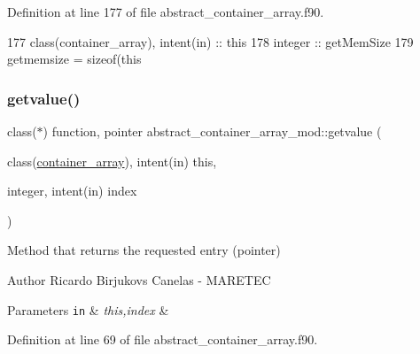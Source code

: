 Definition at line 177 of file abstract\+\_\+container\+\_\+array.\+f90.


\begin{DoxyCode}
177     \textcolor{keywordtype}{class}(container\_array), \textcolor{keywordtype}{intent(in)} :: this
178     \textcolor{keywordtype}{integer} :: getMemSize
179     getmemsize = sizeof(this%
\end{DoxyCode}
\mbox{\label{namespaceabstract__container__array__mod_a2b3e0aec504d76c73bf7f18158924af4}} 
\subsubsection{\texorpdfstring{getvalue()}{getvalue()}}
{\footnotesize\ttfamily class($\ast$) function, pointer abstract\+\_\+container\+\_\+array\+\_\+mod\+::getvalue (\begin{DoxyParamCaption}\item[{class(\mbox{\hyperlink{structabstract__container__array__mod_1_1container__array}{container\+\_\+array}}), intent(in)}]{this,  }\item[{integer, intent(in)}]{index }\end{DoxyParamCaption})\hspace{0.3cm}{\ttfamily [private]}}



Method that returns the requested entry (pointer) 

\begin{DoxyAuthor}{Author}
Ricardo Birjukovs Canelas -\/ M\+A\+R\+E\+T\+EC 
\end{DoxyAuthor}

\begin{DoxyParams}[1]{Parameters}
\mbox{\tt in}  & {\em this,index} & \\
\hline
\end{DoxyParams}


Definition at line 69 of file abstract\+\_\+container\+\_\+array.\+f90.


